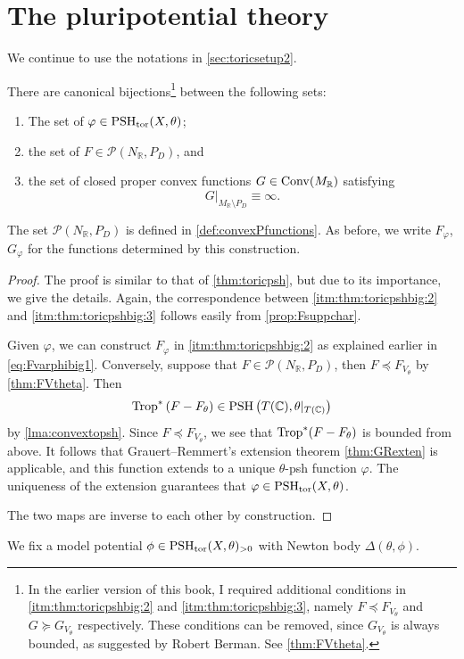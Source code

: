 \section{The pluripotential theory}\label{sec:toric_ppt_general}
We continue to use the notations in \cref{sec:toricsetup2}.

\begin{theorem}\label{thm:toricpshbig}
    There are canonical bijections\footnote{In the earlier version of this book, I required additional conditions in \ref{itm:thm:toricpshbig:2} and \ref{itm:thm:toricpshbig:3}, namely $F\preceq F_{V_{\theta}}$ and $G\succeq G_{V_{\theta}}$ respectively. These conditions can be removed, since $G_{V_{\theta}}$ is always bounded, as suggested by Robert Berman. See \cref{thm:FVtheta}.} between the following sets:
    \begin{enumerate}
        \item\label{itm:thm:toricpshbig:1} The set of $\varphi\in \mathrm{PSH}_{\mathrm{tor}}(X,\theta)$;
        \item\label{itm:thm:toricpshbig:2} the set of $F\in \mathcal{P}(N_{\mathbb{R}},P_D)$, and
        \item\label{itm:thm:toricpshbig:3} the set of closed proper convex functions $G\in \mathrm{Conv}(M_{\mathbb{R}})$ satisfying
        \[
        G|_{M_{\mathbb{R}}\setminus P_D}\equiv \infty.
        \]
    \end{enumerate}
\end{theorem}
The set $\mathcal{P}(N_{\mathbb{R}},P_D)$ is defined in \cref{def:convexPfunctions}.
As before, we write $F_{\varphi}$, $G_{\varphi}$ for the functions determined by this construction.

\begin{proof}
    The proof is similar to that of \cref{thm:toricpsh}, but due to its importance, we give the details. Again, the correspondence between \ref{itm:thm:toricpshbig:2} and \ref{itm:thm:toricpshbig:3} follows easily from \cref{prop:Fsuppchar}.


    Given $\varphi$, we can construct $F_{\varphi}$ in \ref{itm:thm:toricpshbig:2} as explained earlier in \eqref{eq:Fvarphibig1}. Conversely, suppose that $F\in \mathcal{P}(N_{\mathbb{R}},P_D)$, then $F\preceq F_{V_{\theta}}$ by \cref{thm:FVtheta}. Then
    \[
        \operatorname{Trop}^*\left(F-F_{\theta}\right)\in \mathrm{PSH}\left(T(\mathbb{C}),\theta|_{T(\mathbb{C})}\right)
    \]
    by \cref{lma:convextopsh}.
    Since $F\preceq F_{V_{\theta}}$, we see that $\operatorname{Trop}^*(F-F_{\theta})$ is bounded from above. It follows that Grauert--Remmert's extension theorem \cref{thm:GRexten} is applicable, and this function extends to a unique $\theta$-psh function $\varphi$. The uniqueness of the extension guarantees that $\varphi\in \mathrm{PSH}_{\mathrm{tor}}(X,\theta)$.

    The two maps are inverse to each other by construction.
\end{proof}
We fix a model potential $\phi\in \mathrm{PSH}_{\mathrm{tor}}(X,\theta)_{>0}$ with Newton body $\Delta(\theta,\phi)$.

